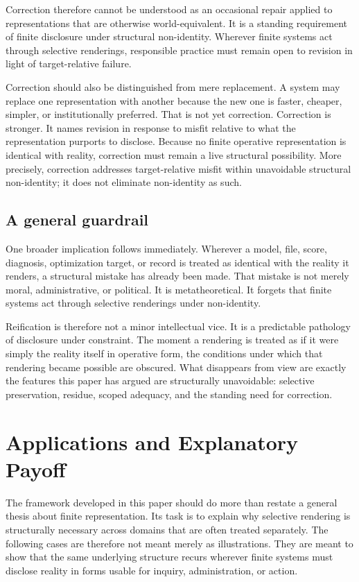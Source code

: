 \documentclass[11pt]{article}
\begin{document}
Correction therefore cannot be understood as an occasional repair applied to representations that are otherwise world-equivalent. It is a standing requirement of finite disclosure under structural non-identity. Wherever finite systems act through selective renderings, responsible practice must remain open to revision in light of target-relative failure.

Correction should also be distinguished from mere replacement. A system may replace one representation with another because the new one is faster, cheaper, simpler, or institutionally preferred. That is not yet correction. Correction is stronger. It names revision in response to misfit relative to what the representation purports to disclose. Because no finite operative representation is identical with reality, correction must remain a live structural possibility. More precisely, correction addresses target-relative misfit within unavoidable structural non-identity; it does not eliminate non-identity as such.

\subsection{A general guardrail}

One broader implication follows immediately. Wherever a model, file, score, diagnosis, optimization target, or record is treated as identical with the reality it renders, a structural mistake has already been made. That mistake is not merely moral, administrative, or political. It is metatheoretical. It forgets that finite systems act through selective renderings under non-identity.

Reification is therefore not a minor intellectual vice. It is a predictable pathology of disclosure under constraint. The moment a rendering is treated as if it were simply the reality itself in operative form, the conditions under which that rendering became possible are obscured. What disappears from view are exactly the features this paper has argued are structurally unavoidable: selective preservation, residue, scoped adequacy, and the standing need for correction.
\section{Applications and Explanatory Payoff}

The framework developed in this paper should do more than restate a general thesis about finite representation. Its task is to explain why selective rendering is structurally necessary across domains that are often treated separately. The following cases are therefore not meant merely as illustrations. They are meant to show that the same underlying structure recurs wherever finite systems must disclose reality in forms usable for inquiry, administration, or action.
\end{document}
